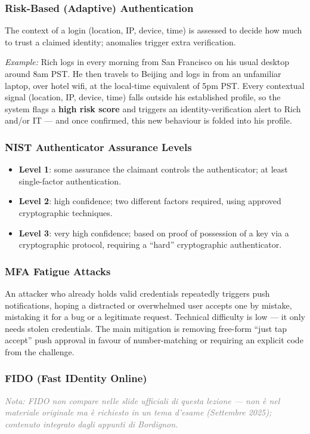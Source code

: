 \documentclass[12pt, a4paper]{article}
\begin{document}
\subsubsection{Risk-Based (Adaptive) Authentication}
The context of a login (location, IP, device, time) is assessed to decide how much to trust a claimed identity; anomalies trigger extra verification.

\textit{Example:} Rich logs in every morning from San Francisco on his usual desktop around 8am PST. He then travels to Beijing and logs in from an unfamiliar laptop, over hotel wifi, at the local-time equivalent of 5pm PST. Every contextual signal (location, IP, device, time) falls outside his established profile, so the system flags a \textbf{high risk score} and triggers an identity-verification alert to Rich and/or IT — and once confirmed, this new behaviour is folded into his profile.

\subsubsection{NIST Authenticator Assurance Levels}
\begin{itemize}
    \item \textbf{Level 1}: some assurance the claimant controls the authenticator; at least single-factor authentication.
    \item \textbf{Level 2}: high confidence; two different factors required, using approved cryptographic techniques.
    \item \textbf{Level 3}: very high confidence; based on proof of possession of a key via a cryptographic protocol, requiring a ``hard'' cryptographic authenticator.
\end{itemize}

\subsubsection{MFA Fatigue Attacks}
An attacker who already holds valid credentials repeatedly triggers push notifications, hoping a distracted or overwhelmed user accepts one by mistake, mistaking it for a bug or a legitimate request. Technical difficulty is low — it only needs stolen credentials. The main mitigation is removing free-form ``just tap accept'' push approval in favour of number-matching or requiring an explicit code from the challenge.

\subsubsection{FIDO (Fast IDentity Online)}
\textcolor{gray}{\textit{Nota: FIDO non compare nelle slide ufficiali di questa lezione — non è nel materiale originale ma è richiesto in un tema d'esame (Settembre 2025); contenuto integrato dagli appunti di Bordignon.}}
\end{document}
